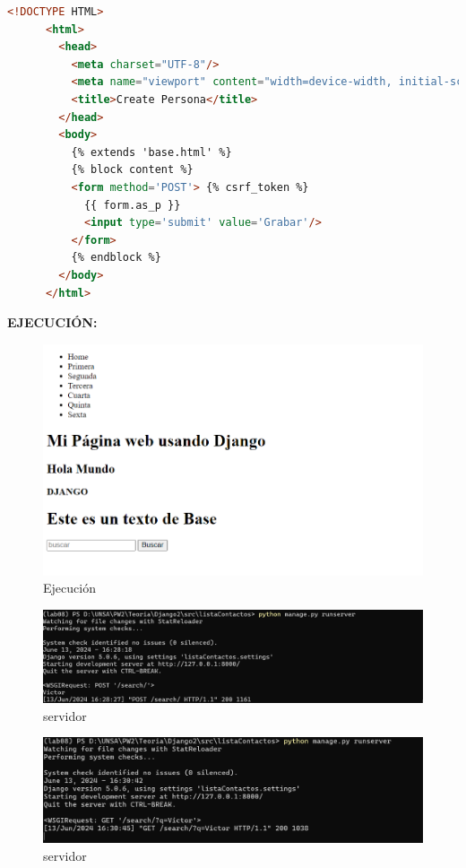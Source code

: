 \documentclass{article}
\begin{document}
    \begin{lstlisting}[language=html]
      <!DOCTYPE HTML>
      <html>
        <head>
          <meta charset="UTF-8"/>
          <meta name="viewport" content="width=device-width, initial-scale=1.0"/>
          <title>Create Persona</title>
        </head>
        <body>
          {% extends 'base.html' %}
          {% block content %}
          <form method='POST'> {% csrf_token %}
            {{ form.as_p }}
            <input type='submit' value='Grabar'/>
          </form>
          {% endblock %}
        </body>
      </html>
    \end{lstlisting}
    \textbf{EJECUCIÓN: }
    \begin{figure}[H]
      \centering
      \includegraphics[width=1\textwidth, keepaspectratio]{img/ejecucion4.png}
      \caption{Ejecución}
    \end{figure}
    \begin{figure}[H]
      \centering
      \includegraphics[width=1\textwidth, keepaspectratio]{img/post.png}
      \caption{servidor}
    \end{figure}
    \begin{figure}[H]
      \centering
      \includegraphics[width=1\textwidth, keepaspectratio]{img/get.png}
      \caption{servidor}
    \end{figure}
  
\end{document}

